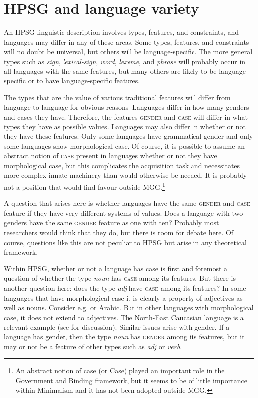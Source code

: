 \documentclass[output=paper]{langsci/langscibook}
\begin{document}
\section{HPSG and language variety}\label{sec-5:4}

An \gls{HPSG} linguistic description involves types, features, and constraints,
and languages may differ in any of these areas. Some types, features, and
constraints will no doubt be universal, but others will be language-specific.
The more general types such as \emph{sign}, \emph{lexical-sign}, \emph{word},
\emph{lexeme}, and \emph{phrase} will probably occur in all languages with the
same features, but many others are likely to be language-specific or to have
language-specific features.

The types that are the value of various traditional features will differ from
language to language for obvious reasons. Languages differ in how many genders
and cases they have. Therefore, the features \textsc{gender} and \textsc{case} will differ in
what types they have as possible values. Languages may also differ in whether
or not they have these features. Only some languages have grammatical gender
and only some languages show morphological case. Of course, it is possible to
assume an abstract notion of \textsc{case} present in languages whether or not they have
morphological case, but this complicates the acquisition task and necessitates
more complex innate machinery than would otherwise be needed. It is probably
not a position that would find favour outside MGG.\footnote{An abstract notion
of case (or Case) played an important role in the Government and Binding
framework, but it seems to be of little importance within Minimalism and it has
not been adopted outside \gls{MGG}.}

A question that arises here is whether languages have the same \textsc{gender} and \textsc{case}
feature if they have very different systems of values. Does a language with two
genders have the same \textsc{gender} feature as one with ten? Probably most researchers
would think that they do, but there is room for debate here. Of course,
questions like this are not peculiar to \gls{HPSG} but arise in any theoretical
framework.

Within \gls{HPSG}, whether or not a language has case is first and foremost a
question of whether the type \emph{noun} has \textsc{case} among its features. But there
is another question here: does the type \emph{adj} have \textsc{case} among its
features?  In some languages that have morphological case it is clearly a
property of adjectives as well as nouns. Consider e.g.  or Arabic.
But in other languages with morphological case, it does not extend to
adjectives. The North-East Caucasian language  is a relevant example
(see \citealt{BonBroChuCor2016} for discussion). Similar issues arise with
gender. If a language has gender, then the type \emph{noun} has \textsc{gender} among
its features, but it may or not be a feature of other types such as \emph{adj} or
\emph{verb}.
\end{document}

